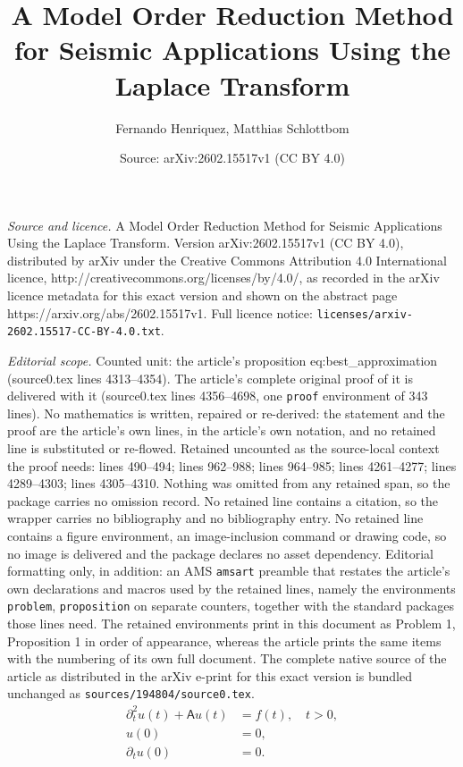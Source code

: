 \documentclass[10pt,a4paper]{amsart}
\title{A Model Order Reduction Method for Seismic Applications Using the Laplace Transform}
\author{Fernando Henriquez, Matthias Schlottbom}
\date{Source: arXiv:2602.15517v1 (CC BY 4.0)}
\begin{document}
\maketitle

\noindent\emph{Source and licence.} A Model Order Reduction Method for Seismic Applications Using the Laplace Transform. Version arXiv:2602.15517v1 (CC BY 4.0), distributed by arXiv under the Creative Commons Attribution 4.0 International licence, http://creativecommons.org/licenses/by/4.0/, as recorded in the arXiv licence metadata for this exact version and shown on the abstract page https://arxiv.org/abs/2602.15517v1. Full licence notice: \texttt{licenses/arxiv-2602.15517-CC-BY-4.0.txt}.\par\smallskip

\noindent\textit{Editorial scope.} Counted unit: the article's proposition eq:best\_approximation (source0.tex lines 4313--4354). The article's complete original proof of it is delivered with it (source0.tex lines 4356--4698, one \texttt{proof} environment of 343 lines). No mathematics is written, repaired or re-derived: the statement and the proof are the article's own lines, in the article's own notation, and no retained line is substituted or re-flowed.  Retained uncounted as the source-local context the proof needs: lines 490--494; lines 962--988; lines 964--985; lines 4261--4277; lines 4289--4303; lines 4305--4310.  Nothing was omitted from any retained span, so the package carries no omission record.  No retained line contains a citation, so the wrapper carries no bibliography and no bibliography entry.  No retained line contains a figure environment, an image-inclusion command or drawing code, so no image is delivered and the package declares no asset dependency.  Editorial formatting only, in addition: an AMS \texttt{amsart} preamble that restates the article's own declarations and macros used by the retained lines, namely the environments \texttt{problem}, \texttt{proposition} on separate counters, together with the standard packages those lines need.  The retained environments print in this document as Problem 1, Proposition 1 in order of appearance, whereas the article prints the same items with the numbering of its own full document.  The complete native source of the article as distributed in the arXiv e-print for this exact version is bundled unchanged as \texttt{sources/194804/source0.tex}.
\begin{align}
    \partial_t^2 u(t) + \mathsf{A} u(t) &= f(t), \quad t>0, \label{eq:wave}\\
    u(0) &= 0, \label{eq:ic1}\\
    \partial_t u(0) &= 0. \label{eq:ic2}
\end{align}
\end{document}
